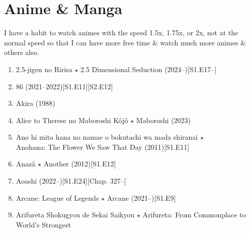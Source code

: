 \documentclass{article}
\begin{document}
\section{Anime \& Manga}
I have a habit to watch animes with the speed 1.5x, 1.75x, or 2x, not at the normal speed so that I can have more free time \& watch much more animes \& others also.
\begin{enumerate}
	\item 2.5-jigen no Ririsa $\star$ 2.5 Dimensional Seduction (2024--)\hfill[S1.E17--]
	\item 86 (2021--2022)\hfill[S1.E11][S2.E12]
    \item {\sc Akira} (1988)
    \item {\sc Alice to Therese no Maboroshi Kôjô $\star$ Maboroshi} (2023)
    \item {\sc Ano hi mita hana no namae o bokutachi wa mada shiranai $\star$\\Anohana: The Flower We Saw That Day} (2011)\hfill[S1.E11]
    \item {\sc Anazâ $\star$ Another} (2012)\hfill[S1.E12]
    \item Aoashi (2022--)\hfill[S1.E24][Chap. 327--]
    \item {\sc Arcane: League of Legends $\star$ Arcane} (2021--)\hfill[S1.E9]
    \item  Arifureta Shokugyou de Sekai Saikyou $\star$ Arifureta: From Commonplace to World's Strongest
    

\end{enumerate}
\end{document}
